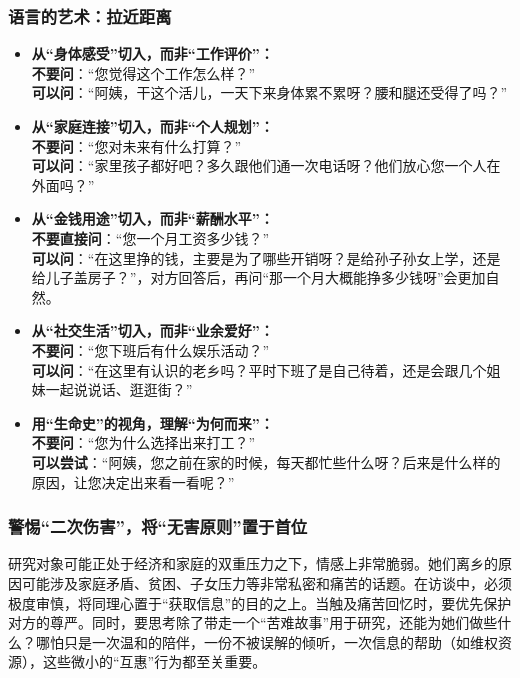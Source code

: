 \documentclass[UTF8]{ctexart}
\begin{document}
\subsubsection{语言的艺术：拉近距离}
\begin{itemize}[label=\textbullet, leftmargin=*]
    \item \textbf{从“身体感受”切入，而非“工作评价”：}\\
    \textbf{不要问}：“您觉得这个工作怎么样？”\\
    \textbf{可以问}：“阿姨，干这个活儿，一天下来身体累不累呀？腰和腿还受得了吗？”
    \item \textbf{从“家庭连接”切入，而非“个人规划”：}\\
    \textbf{不要问}：“您对未来有什么打算？”\\
    \textbf{可以问}：“家里孩子都好吧？多久跟他们通一次电话呀？他们放心您一个人在外面吗？”
    \item \textbf{从“金钱用途”切入，而非“薪酬水平”：}\\
    \textbf{不要直接问}：“您一个月工资多少钱？”\\
    \textbf{可以问}：“在这里挣的钱，主要是为了哪些开销呀？是给孙子孙女上学，还是给儿子盖房子？”，对方回答后，再问“那一个月大概能挣多少钱呀”会更加自然。
    \item \textbf{从“社交生活”切入，而非“业余爱好”：}\\
    \textbf{不要问}：“您下班后有什么娱乐活动？”\\
    \textbf{可以问}：“在这里有认识的老乡吗？平时下班了是自己待着，还是会跟几个姐妹一起说说话、逛逛街？”
    \item \textbf{用“生命史”的视角，理解“为何而来”：}\\
    \textbf{不要问}：“您为什么选择出来打工？”\\
    \textbf{可以尝试}：“阿姨，您之前在家的时候，每天都忙些什么呀？后来是什么样的原因，让您决定出来看一看呢？”
\end{itemize}

\subsubsection{警惕“二次伤害”，将“无害原则”置于首位}
研究对象可能正处于经济和家庭的双重压力之下，情感上非常脆弱。她们离乡的原因可能涉及家庭矛盾、贫困、子女压力等非常私密和痛苦的话题。在访谈中，必须极度审慎，将同理心置于“获取信息”的目的之上。当触及痛苦回忆时，要优先保护对方的尊严。同时，要思考除了带走一个“苦难故事”用于研究，还能为她们做些什么？哪怕只是一次温和的陪伴，一份不被误解的倾听，一次信息的帮助（如维权资源），这些微小的“互惠”行为都至关重要。
\end{document}
